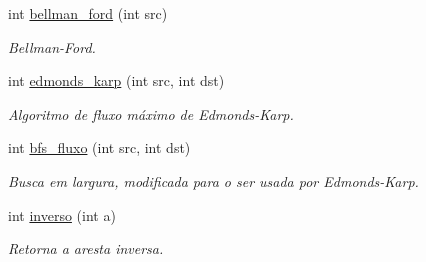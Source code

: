 \begin{DoxyCompactItemize}
int \hyperlink{structgrafo_a0f981ed5e3298233a8e573fa44ddf87e}{bellman\_\-ford} (int src)
\begin{DoxyCompactList}\small\item\em Bellman-\/Ford. \item\end{DoxyCompactList}\item 
int \hyperlink{structgrafo_aca7cabbd616b0a82a367a86d8e2f0fd2}{edmonds\_\-karp} (int src, int dst)
\begin{DoxyCompactList}\small\item\em Algoritmo de fluxo máximo de Edmonds-\/Karp. \item\end{DoxyCompactList}\item 
int \hyperlink{structgrafo_a3ccc56906f3bde5fe92ddd4cdcde1cf4}{bfs\_\-fluxo} (int src, int dst)
\begin{DoxyCompactList}\small\item\em Busca em largura, modificada para o ser usada por Edmonds-\/Karp. \item\end{DoxyCompactList}\item 
int \hyperlink{structgrafo_a29123b27d787f47c2bd1905594a09903}{inverso} (int a)
\begin{DoxyCompactList}\small\item\em Retorna a aresta inversa. \item\end{DoxyCompactList}\end{DoxyCompactItemize}
